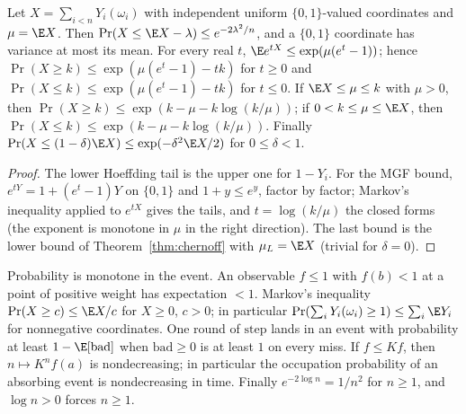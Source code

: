 \begin{theorem}\label{thm:chernoffmgf}
\leanok{}
Let $X=\sum_{i<n}Y_i(\omega_i)$ with independent uniform $\{0,1\}$-valued
coordinates and $\mu=\E X$. Then $\Pr(X\le\E X-\lambda)\le e^{-2\lambda^2/n}$, and a
$\{0,1\}$ coordinate has variance at most its mean. For every real $t$,
$\E e^{tX}\le\exp(\mu(e^t-1))$; hence $\Pr(X\ge k)\le\exp(\mu(e^t-1)-tk)$ for
$t\ge0$ and $\Pr(X\le k)\le\exp(\mu(e^t-1)-tk)$ for $t\le0$. If $\E X\le\mu\le k$
with $\mu>0$, then $\Pr(X\ge k)\le\exp(k-\mu-k\log(k/\mu))$; if $0<k\le\mu\le\E X$,
then $\Pr(X\le k)\le\exp(k-\mu-k\log(k/\mu))$. Finally
$\Pr(X\le(1-\delta)\E X)\le\exp(-\delta^2\E X/2)$ for $0\le\delta<1$.
\end{theorem}
\begin{proof}\leanok
The lower Hoeffding tail is the upper one for $1-Y_i$. For the MGF bound,
$e^{tY}=1+(e^t-1)Y$ on $\{0,1\}$ and $1+y\le e^y$, factor by factor; Markov's
inequality applied to $e^{tX}$ gives the tails, and $t=\log(k/\mu)$ the closed forms
(the exponent is monotone in $\mu$ in the right direction). The last bound is the
lower bound of Theorem~\ref{thm:chernoff} with $\mu_L=\E X$ (trivial for $\delta=0$).
\end{proof}
\begin{lemma}\label{lem:tail}
\leanok{}
Probability is monotone in the event. An observable $f\le1$ with $f(b)<1$ at a
point of positive weight has expectation $<1$. Markov's inequality
$\Pr(X\ge c)\le\E X/c$ for $X\ge0$, $c>0$; in particular
$\Pr(\sum_iY_i(\omega_i)\ge1)\le\sum_i\E Y_i$ for nonnegative coordinates. One
round of $\mathrm{step}$ lands in an event with probability at least
$1-\E[\mathrm{bad}]$ when $\mathrm{bad}\ge0$ is at least $1$ on every miss. If
$f\le Kf$, then $n\mapsto K^nf(a)$ is nondecreasing; in particular the occupation
probability of an absorbing event is nondecreasing in time. Finally
$e^{-2\log n}=1/n^2$ for $n\ge1$, and $\log n>0$ forces $n\ge1$.
\end{lemma}
